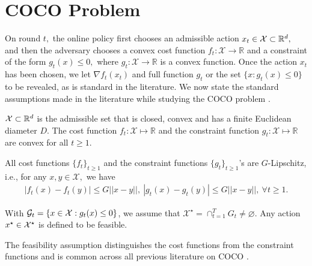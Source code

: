 \section{COCO Problem}




On round $t,$ the online policy first chooses an admissible action $x_t \in \mathcal{X}\subset {\mathbb{R}}^d,$ 
 and then the adversary chooses a convex cost function $f_t: \mathcal{X} \to \mathbb{R}$ and a constraint of the form $g_{t}(x) \leq 0,$ where $g_{t}: \mathcal{X} \to \mathbb{R}$ is a convex function. Once the action $x_t$ has been chosen, we let $\nabla f_t(x_t)$ and full function $g_t$ or the set $\{x: g_t(x)\le 0\}$ to be revealed, as is standard in the literature.
 We now state the  standard assumptions made  in the  literature while studying the COCO problem \cite{guo2022online, yi2021regret, neely2017online, Sinha2024}.
\begin{assumption}[Convexity] \label{cvx}
$\mathcal{X} \subset {\mathbb{R}}^d$ is the admissible set that is closed, convex and has a finite Euclidean diameter $D$.  The cost function $f_t: \mathcal{X} \mapsto \mathbb{R}$ and the constraint function $g_{t}: \mathcal{X} \mapsto \mathbb{R}$ are convex for all $t\geq 1$.  
\end{assumption}
\begin{assumption}[Lipschitzness] \label{bddness}
All cost functions $\{f_t\}_{t\geq 1}$ and the constraint functions $\{g_{t}\}_{ t\geq 1}$'s are $G$-Lipschitz, i.e., for any $x, y \in \mathcal{X},$ we have 
 \begin{eqnarray*}
 	|f_t(x)-f_t(y)| \leq G||x-y||,~
 	|g_{t}(x)-g_{t}(y)| \leq G||x-y||, ~\forall t\geq 1.
 \end{eqnarray*}
	\end{assumption}
 \begin{assumption}[Feasibility] \label{feas-constr}
With ${\cal G}_t = \{x\in \mathcal{X} : g_t(x)\le 0\}$, we assume that  $\mathcal{X}^\star = \cap_{t=1}^T G_t  \neq \varnothing $.	
Any action $x^\star \in \mathcal{X}^\star$ is defined to be feasible. %
\end{assumption}
The feasibility assumption distinguishes the cost functions from the constraint functions and is common across all previous literature on COCO \cite{guo2022online, neely2017online, yu2016low,yuan2018online,yi2023distributed, georgios-cautious,Sinha2024}. 

